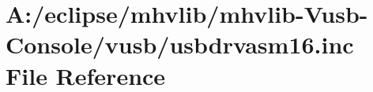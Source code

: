 \hypertarget{mhvlib-_vusb-_console_2vusb_2usbdrvasm16_8inc}{\section{A\-:/eclipse/mhvlib/mhvlib-\/\-Vusb-\/\-Console/vusb/usbdrvasm16.inc File Reference}
\label{mhvlib-_vusb-_console_2vusb_2usbdrvasm16_8inc}
}
